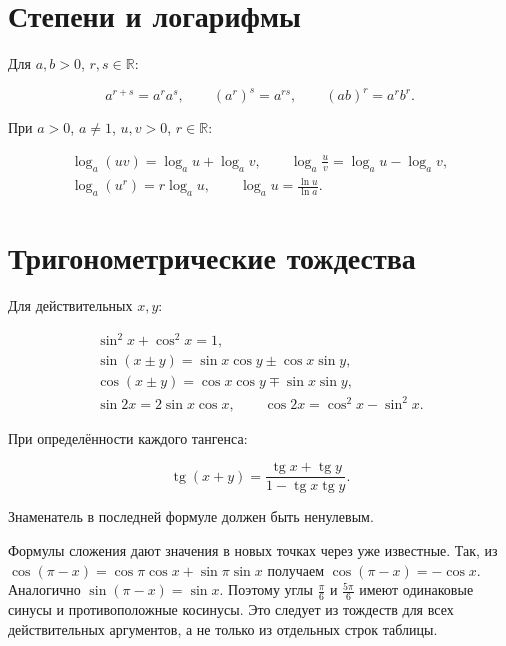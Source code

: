 \section*{Степени и логарифмы}

Для \(a,b>0\), \(r,s\in\mathbb R\):

\[a^{r+s}=a^ra^s,\qquad (a^r)^s=a^{rs},\qquad (ab)^r=a^rb^r.\]

При \(a>0\), \(a\ne1\), \(u,v>0\), \(r\in\mathbb R\):

\[\begin{gathered}\log_a(uv)=\log_a u+\log_a v,\qquad \log_a\frac uv=\log_a u-\log_a v,\\\log_a(u^r)=r\log_a u,\qquad\log_a u=\frac{\ln u}{\ln a}.\end{gathered}\]

\section*{Тригонометрические тождества}

Для действительных \(x,y\):

\[\begin{gathered}\sin^2x+\cos^2x=1,\\\sin(x\pm y)=\sin x\cos y\pm\cos x\sin y,\\\cos(x\pm y)=\cos x\cos y\mp\sin x\sin y,\\\sin2x=2\sin x\cos x,\qquad\cos2x=\cos^2x-\sin^2x.\end{gathered}\]

При определённости каждого тангенса:

\[\operatorname{tg}(x+y)=\frac{\operatorname{tg}x+\operatorname{tg}y}{1-\operatorname{tg}x\operatorname{tg}y}.\]

Знаменатель в последней формуле должен быть ненулевым.


Формулы сложения дают значения в новых точках через уже известные. Так, из \(\cos(\pi-x)=\cos\pi\cos x+\sin\pi\sin x\) получаем \(\cos(\pi-x)=-\cos x\). Аналогично \(\sin(\pi-x)=\sin x\). Поэтому углы \(\frac\pi6\) и \(\frac{5\pi}6\) имеют одинаковые синусы и противоположные косинусы. Это следует из тождеств для всех действительных аргументов, а не только из отдельных строк таблицы.

